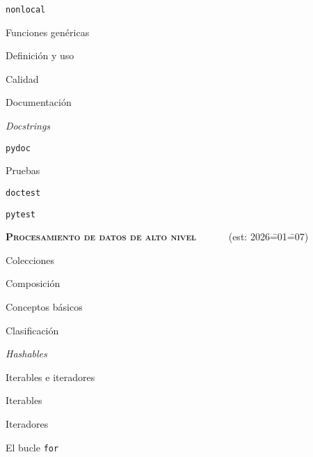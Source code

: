 \begin{longenum}
\begin{longenum}
\begin{longenum}
\begin{longenum}
                \item \texttt{nonlocal}
            \end{longenum}
        \end{longenum}
        \item Funciones genéricas
        \begin{longenum}
            \item Definición y uso
        \end{longenum}
        \item Calidad \opcional\
        \begin{longenum}
            \item Documentación
            \begin{longenum}
                \item \textit{Docstrings}
                \item \texttt{pydoc}
            \end{longenum}
            \item Pruebas
            \begin{longenum}
                \item \texttt{doctest}
                \item \texttt{pytest}
            \end{longenum}
        \end{longenum}
    \end{longenum}
    \item \textbf{\textsc{Procesamiento de datos de alto nivel}} \ce{6b}\ \ce{6c}\ \ce{6e}\ \ce{6f}\ \ev2\ \ra6\ (est: 2026\==01\==07)
    \begin{longenum}
        \item Colecciones
        \begin{longenum}
            \item Composición
            \item Conceptos básicos
            \item Clasificación
            \item \textit{Hashables}
        \end{longenum}
        \item Iterables e iteradores
        \begin{longenum}
            \item Iterables
            \item Iteradores
            \begin{longenum}
                \item El bucle \texttt{for}

\end{longenum}
\end{longenum}
\end{longenum}
\end{longenum}
